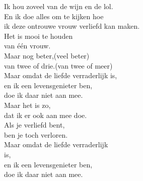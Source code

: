 \clearpage
\begin{translation}
Ik hou zoveel van de wijn en de lol.\\
En ik doe alles om te kijken hoe\\
ik deze ontrouwe vrouw verliefd kan maken.\\
Het is mooi te houden\\
van één vrouw.\\
Maar nog beter,(veel beter)\\
van twee of drie.(van twee of meer)\\
Maar omdat de liefde verraderlijk is,\\
en ik een levensgenieter ben,\\
doe ik daar niet aan mee.\\
Maar het is zo,\\
dat ik er ook aan mee doe.\\
Als je verliefd bent,\\
ben je toch verloren.\\
Maar omdat de liefde verraderlijk\\ is,\\
en ik een levensgenieter ben,\\
doe ik daar niet aan mee.\\
\end{translation}

